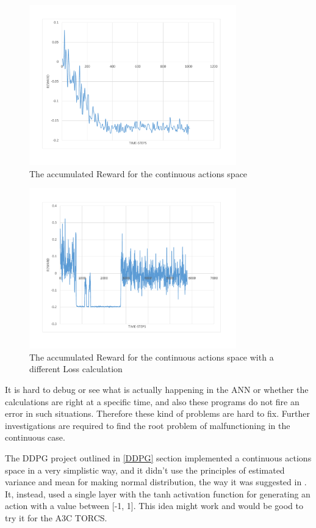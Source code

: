 \begin{figure}[H]
	\centering
	\includegraphics[width=0.8\textwidth]{Figures/ContinuousLoss1}
	\caption{The accumulated Reward for the continuous actions space}
	\label{fig:ContinuousLoss1}
\end{figure}
\begin{figure}[H]
	\centering
	\includegraphics[width=0.8\textwidth]{Figures/ContinuousLoss2}
	\caption{The accumulated Reward for the continuous actions space with a different Loss calculation}
	\label{fig:ContinuousLoss2}
\end{figure}

It is hard to debug or see what is actually happening in the ANN or whether the calculations are right at a specific time, and also these programs do not fire an error in such situations. Therefore these kind of problems are hard to fix. Further investigations are required to find the root problem of malfunctioning in the continuous case.

The DDPG project outlined in \ref{DDPG} section implemented a continuous actions space in a very simplistic way, and it didn't use the principles of estimated variance and mean for making normal distribution, the way it was suggested in \cite{Sutton}. It, instead, used a single layer with the tanh activation function for generating an action with a value between [-1, 1]. This idea might work and would be good to try it for the A3C TORCS.